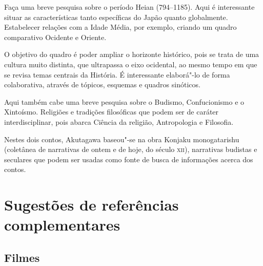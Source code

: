 \documentclass[12pt]{extarticle}
\begin{document}
Faça uma breve pesquisa sobre o período Heian (794--1185). Aqui é interessante
situar as características tanto específicas do Japão quanto globalmente.
Estabelecer relações com a Idade Média, por exemplo, criando um quadro
comparativo Ocidente e Oriente.

O objetivo do quadro é poder ampliar o horizonte histórico, pois se trata de
uma cultura muito distinta, que ultrapassa o eixo ocidental, ao mesmo tempo em
que se revisa temas centrais da História. É interessante elaborá"-lo de forma
colaborativa, através de tópicos, esquemas e quadros sinóticos.

Aqui também cabe uma breve pesquisa sobre o Budismo, Confucionismo e o
Xintoísmo. Religiões e tradições filosóficas que podem ser de caráter
interdisciplinar, pois abarca Ciência da religião, Antropologia e Filosofia.

Nestes dois contos, Akutagawa baseou"-se na obra Konjaku monogatarishu
(coletânea de narrativas de ontem e de hoje, do século \textsc{xii}),
narrativas budistas e seculares que podem ser usadas como fonte de busca de
informações acerca dos contos.

\section{Sugestões de referências complementares}\label{sugestoes}\label{sugestoes}

\subsection{Filmes}
\end{document}
